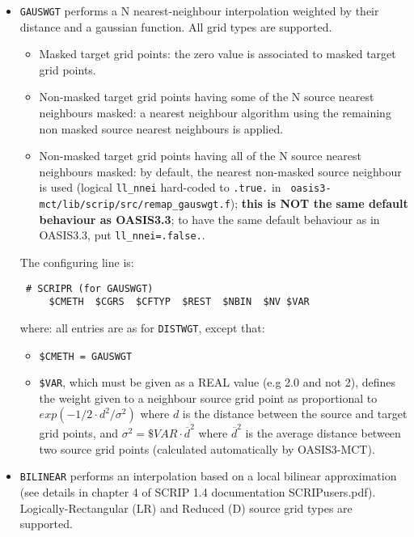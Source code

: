 \begin{itemize}
\begin{itemize}
  \item {\tt GAUSWGT} performs a N nearest-neighbour interpolation
    weighted by their distance and a gaussian function. All grid types
    are supported.
    \begin{itemize}

    \item Masked target grid points: the zero value is associated to
      masked target grid points.

    \item Non-masked target grid points having some of the N source
      nearest neighbours masked: a nearest neighbour algorithm using
      the remaining non masked source nearest neighbours is applied.

    \item Non-masked target grid points having all of the N source
      nearest neighbours masked: by default, the nearest non-masked
      source neighbour is used (logical {\tt ll\_nnei} hard-coded to
      {\tt .true.} in {\tt
        oasis3-mct/lib/scrip/src/remap\_gauswgt.f}); {\bf this is NOT
        the same default behaviour as OASIS3.3}; to have the same
      default behaviour as in OASIS3.3, put {\tt ll\_nnei=.false.}.
    \end{itemize}

    The configuring line is:
  \begin{verbatim}
 # SCRIPR (for GAUSWGT)
     $CMETH  $CGRS  $CFTYP  $REST  $NBIN  $NV $VAR
\end{verbatim}
    where:
    all entries are as for {\tt DISTWGT}, except that:
    \begin{itemize}
    \item {\tt \$CMETH = GAUSWGT}
    \item {\tt \$VAR}, which must be given as a REAL value (e.g 2.0
      and not 2), defines the weight given to a neighbour source grid
      point as proportional to $exp(-1/2 \cdot d^2/\sigma^2)$ where
      $d$ is the distance between the source and target grid points,
      and $\sigma^2 = \$VAR \cdot \overline{d}^2$ where
      $\overline{d}^2$ is the average distance between two source grid
      points (calculated automatically by OASIS3-MCT).
    \end{itemize}

  \item {\tt BILINEAR} performs an interpolation based on a local
    bilinear approximation (see details in chapter 4 of SCRIP 1.4
    documentation SCRIPusers.pdf). Logically-Rectangular (LR) and
    Reduced (D) source grid types are supported.


\end{itemize}
\end{itemize}
